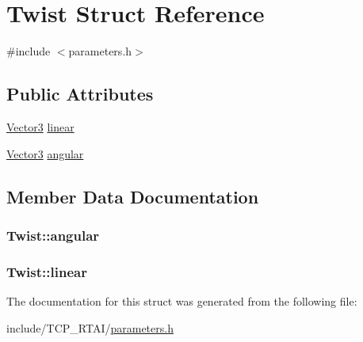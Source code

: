 \hypertarget{structTwist}{
\section{Twist Struct Reference}
\label{structTwist}
}


{\ttfamily \#include $<$parameters.h$>$}

\subsection*{Public Attributes}
\begin{DoxyCompactItemize}
\item 
\hyperlink{structVector3}{Vector3} \hyperlink{structTwist_ad2b9ceff8e27f9ae0722f6b5b3de9842}{linear}
\item 
\hyperlink{structVector3}{Vector3} \hyperlink{structTwist_a2d3363edbb3ea0a7943b45c846230a00}{angular}
\end{DoxyCompactItemize}


\subsection{Member Data Documentation}
\hypertarget{structTwist_a2d3363edbb3ea0a7943b45c846230a00}{
\subsubsection[{angular}]{ {\bf Twist::angular}}}
\label{structTwist_a2d3363edbb3ea0a7943b45c846230a00}
\hypertarget{structTwist_ad2b9ceff8e27f9ae0722f6b5b3de9842}{
\subsubsection[{linear}]{ {\bf Twist::linear}}}
\label{structTwist_ad2b9ceff8e27f9ae0722f6b5b3de9842}


The documentation for this struct was generated from the following file:\begin{DoxyCompactItemize}
\item 
include/TCP\_\-RTAI/\hyperlink{include_2TCP__RTAI_2parameters_8h}{parameters.h}\end{DoxyCompactItemize}
